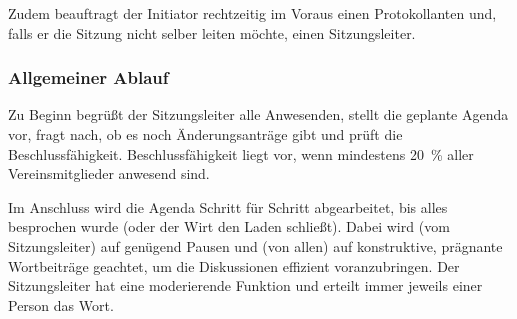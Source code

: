 \documentclass[a4 paper, 11pt]{article}
\begin{document}
Zudem beauftragt der Initiator rechtzeitig im Voraus einen Protokollanten und, falls er die Sitzung nicht selber leiten möchte, einen Sitzungsleiter.

\subsubsection{Allgemeiner Ablauf}
Zu Beginn begrüßt der Sitzungsleiter alle Anwesenden, stellt die geplante Agenda vor, fragt nach, ob es noch Änderungsanträge gibt und prüft die Beschlussfähigkeit.
Beschlussfähigkeit liegt vor, wenn mindestens \SI{20}{\percent} aller Vereinsmitglieder anwesend sind.

Im Anschluss wird die Agenda Schritt für Schritt abgearbeitet, bis alles besprochen wurde (oder der Wirt den Laden schließt). Dabei wird (vom Sitzungsleiter) auf genügend Pausen und (von allen) auf konstruktive, prägnante Wortbeiträge geachtet, um die Diskussionen effizient voranzubringen. Der Sitzungsleiter hat eine moderierende Funktion und erteilt immer jeweils einer Person das Wort. 
\end{document}
